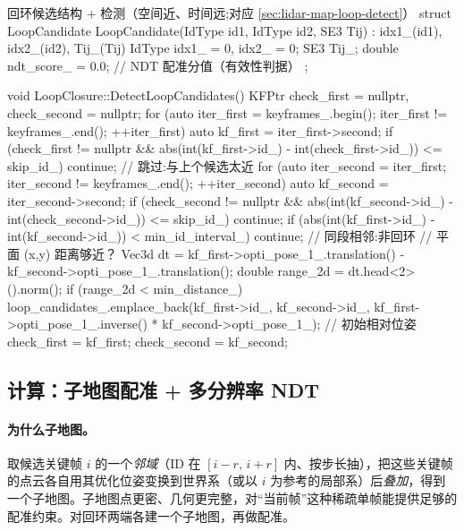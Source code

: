 \begin{codebox}[C++]{回环候选结构 + 检测（空间近、时间远;对应 \cref{sec:lidar-map-loop-detect}）}
struct LoopCandidate {
  LoopCandidate(IdType id1, IdType id2, SE3 Tij) : idx1_(id1), idx2_(id2), Tij_(Tij) {}
  IdType idx1_ = 0, idx2_ = 0;
  SE3    Tij_;
  double ndt_score_ = 0.0;     // NDT 配准分值（有效性判据）
};

void LoopClosure::DetectLoopCandidates() {
  KFPtr check_first = nullptr, check_second = nullptr;
  for (auto iter_first = keyframes_.begin(); iter_first != keyframes_.end(); ++iter_first) {
    auto kf_first = iter_first->second;
    if (check_first != nullptr &&
        abs(int(kf_first->id_) - int(check_first->id_)) <= skip_id_) continue;  // 跳过:与上个候选太近
    for (auto iter_second = iter_first; iter_second != keyframes_.end(); ++iter_second) {
      auto kf_second = iter_second->second;
      if (check_second != nullptr &&
          abs(int(kf_second->id_) - int(check_second->id_)) <= skip_id_) continue;
      if (abs(int(kf_first->id_) - int(kf_second->id_)) < min_id_interval_) continue; // 同段相邻:非回环
      // 平面 (x,y) 距离够近？
      Vec3d dt = kf_first->opti_pose_1_.translation() - kf_second->opti_pose_1_.translation();
      double range_2d = dt.head<2>().norm();
      if (range_2d < min_distance_) {
        loop_candidates_.emplace_back(kf_first->id_, kf_second->id_,
            kf_first->opti_pose_1_.inverse() * kf_second->opti_pose_1_);          // 初始相对位姿
        check_first = kf_first; check_second = kf_second;
      }
    }
  }
}
\end{codebox}

\subsection{计算：子地图配准 + 多分辨率 NDT}
\label{sec:lidar-map-loop-compute}

\paragraph{为什么子地图。}
取候选关键帧 $i$ 的一个\emph{邻域}（ID 在 $[i-r,\,i+r]$ 内、按步长抽），把这些关键帧的点云各自用其优化位姿变换到世界系（或以 $i$ 为参考的局部系）后\emph{叠加}，得到一个子地图。子地图点更密、几何更完整，对“当前帧”这种稀疏单帧能提供足够的配准约束。对回环两端各建一个子地图，再做配准。

